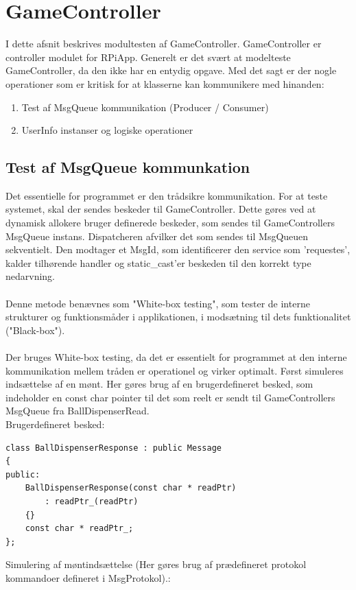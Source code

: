 \documentclass[Modultest/Modultest_main.tex]{subfiles}
\begin{document}
\section{GameController}\label{sec:test_Game}
I dette afsnit beskrives modultesten af GameController. GameController er controller modulet for RPiApp. Generelt er det svært at modelteste GameController, da den ikke har en entydig opgave. Med det sagt er der nogle operationer som er kritisk for at klasserne kan kommunikere med hinanden: 
\begin{enumerate}
    \item Test af MsgQueue kommunikation (Producer / Consumer)
    \item UserInfo instanser og logiske operationer 
\end{enumerate}
\subsection{Test af MsgQueue kommunkation}
Det essentielle for programmet er den trådsikre kommunikation. For at teste systemet, skal der sendes beskeder til GameController. Dette gøres ved at dynamisk allokere bruger definerede beskeder, som sendes til GameControllers MsgQueue instans. Dispatcheren afvilker det som sendes til MsgQueuen sekventielt. Den modtager et MsgId, som identificerer den service som 'requestes', kalder tilhørende handler og static\_cast'er beskeden til den korrekt type nedarvning. \\\\
Denne metode benævnes som "White-box testing", som tester de interne strukturer og funktionsmåder i applikationen, i modsætning til dets funktionalitet ("Black-box").\autocite{Whitebox}\\\\
Der bruges White-box testing, da det er essentielt for programmet at den interne kommunikation mellem tråden er operationel og virker optimalt. 
Først simuleres indsættelse af en mønt. Her gøres brug af en brugerdefineret besked, som indeholder en const char pointer til det som reelt er sendt til GameControllers MsgQueue fra BallDispenserRead. \\
Brugerdefineret besked: 
\begin{lstlisting}
class BallDispenserResponse : public Message
{
public:
	BallDispenserResponse(const char * readPtr)
	    : readPtr_(readPtr)
	{}
	const char * readPtr_;
};
\end{lstlisting}
Simulering af møntindsættelse (Her gøres brug af prædefineret protokol kommandoer defineret i MsgProtokol).: 
\end{document}
